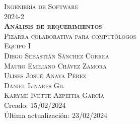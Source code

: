 \thispagestyle{empty}

\begin{center}
    \textsc{\LARGE   Ingeniería de Software \\[5mm]
                    \LARGE 2024-2}      \\[20mm]
    
    \textsc{\textbf{\huge   Análisis de requerimientos}}\\[5mm]
    \textsc{\LARGE  Pizarra colaborativa para computólogos}\\[20mm]

    \LARGE
    \textsc{Equipo I}\\[5mm]
    \Large 
    \textsc{Diego Sebastián Sánchez Correa}\\[2mm]
    \textsc{Mauro Emiliano Chávez Zamora}\\[2mm]
    \textsc{Ulises Josué Anaya Pérez}\\[2mm]
    \textsc{Daniel Linares Gil} \\[2mm]
    \textsc{Karyme Ivette Azpeitia García}
    \\[20mm]

    \large Creado: 15/02/2024\\[2mm]
    \large Última actualización: 23/02/2024\\
    
\end{center}	
\newpage  
